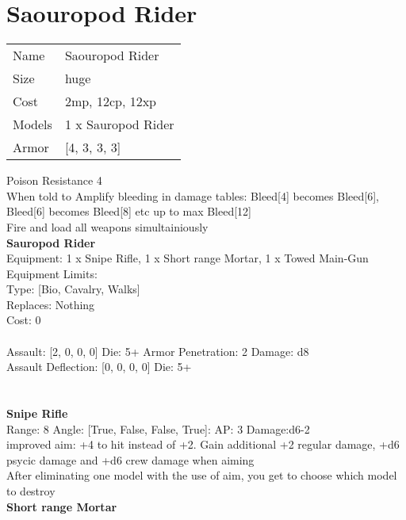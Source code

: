 \pagebreak\pagebreak

\section{ Saouropod Rider }

\begin{tabular}{ll}
  Name & Saouropod Rider \\
  Size & huge\\
  Cost & 2mp, 12cp, 12xp\\
  Models & 1 x Sauropod Rider\\
  Armor & [4, 3, 3, 3]\\
\end{tabular}

\noindent Poison Resistance 4\\ 
When told to Amplify bleeding in damage tables: Bleed[4] becomes Bleed[6], Bleed[6] becomes Bleed[8] etc up to max Bleed[12]\\ 
Fire and load all weapons simultainiously\\ 


{\bf Sauropod Rider } \\
Equipment: 1 x Snipe Rifle, 1 x Short range Mortar, 1 x Towed Main-Gun \\
Equipment Limits:  \\
Type: [Bio, Cavalry, Walks] \\
Replaces: Nothing \\
Cost: 0\\
\ \\
Assault: [2, 0, 0, 0] Die: 5+ Armor Penetration: 2 Damage: d8 \\
Assault Deflection: [0, 0, 0, 0] Die: 5+\\
\indent  
\ \\

\ \\
{\bf Snipe Rifle } \\



Range: 8  Angle: [True, False, False, True]: AP: 3 Damage:d6-2 \\
improved aim: +4 to hit instead of +2. Gain additional +2 regular damage, +d6 psycic damage and +d6 crew damage when aiming\\ 
After eliminating one model with the use of aim, you get to choose which model to destroy\\ 




{\bf Short range Mortar } \\




